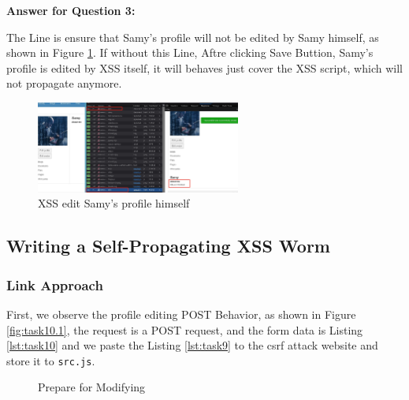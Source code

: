 \documentclass[a4paper,11pt]{article}
\begin{document}
\textbf{Answer for Question 3:} 

The Line is ensure that Samy's profile will not be edited by Samy himself, as shown in Figure \ref{fig:task11.3}. If without this Line, Aftre clicking Save Buttion, Samy's profile is edited by XSS itself, it will behaves just cover the XSS script, which will not propagate anymore. 
\begin{figure}[h]
    \centering
       \includegraphics[width=0.6\textwidth]{figures/task11/task11.3.png}
    \caption{XSS edit Samy's profile himself}\label{fig:task11.3}
\end{figure}

\subsection{Writing a Self-Propagating XSS Worm}
\subsubsection{Link Approach}
First, we observe the profile editing POST Behavior, as shown in Figure \ref{fig:task10.1}, the request is a POST request, and the form data is Listing \ref{lst:task10} and we paste the Listing \ref{lst:task9} to the csrf attack website and store it to \verb|src.js|.

\begin{figure}[h]
    \centering
    \hfill
    \hfill
    \caption{Prepare for Modifying}\label{fig:task10-1}
\end{figure}
\end{document}
